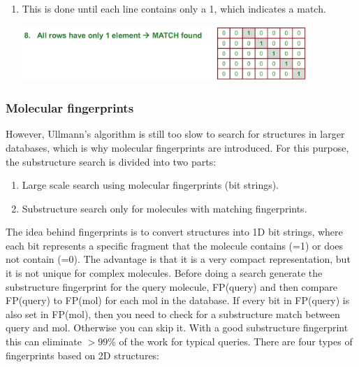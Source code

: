 \begin{enumerate}
    \item This is done until each line contains only a 1, which indicates a match.
    \begin{center}\includegraphics[width=0.85\textwidth]{img/cheminformatics/UllmannBacktrackingC.png}\end{center}
\end{enumerate}

%

\subsubsection{Molecular fingerprints}

However, Ullmann's algorithm is still too slow to search for structures in larger databases, which is why molecular fingerprints are introduced. For this purpose, the substructure search is divided into two parts:

\begin{enumerate}
    \item Large scale search using molecular fingerprints (bit strings).
    \item Substructure search only for molecules with matching fingerprints.
\end{enumerate}

The idea behind fingerprints is to convert structures into 1D bit strings, where each bit represents a specific fragment that the molecule contains (=1) or does not contain (=0). The advantage is that it is a very compact representation, but it is not unique for complex molecules. Before doing a search generate the substructure fingerprint for the query molecule, FP(query) and then compare FP(query) to FP(mol) for each mol in the database. If every bit in FP(query) is also set in FP(mol), then you need to check for a substructure match between query and mol. Otherwise you can skip it. With a good substructure fingerprint this can eliminate $>99\%$ of the work for typical queries. There are four types of fingerprints based on 2D structures:

